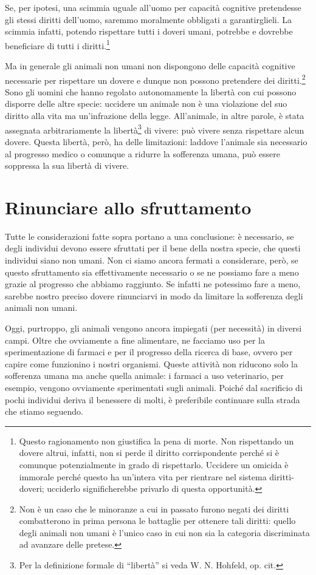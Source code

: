 \documentclass[a4paper,11pt,oneside,article]{memoir}
\begin{document}
Se, per ipotesi, una scimmia uguale all'uomo per capacità cognitive pretendesse
gli stessi diritti dell'uomo, saremmo moralmente obbligati a garantirglieli. La
scimmia infatti, potendo rispettare tutti i doveri umani, potrebbe e dovrebbe
beneficiare di tutti i diritti.\footnote{Questo ragionamento non giustifica la
pena di morte. Non rispettando un dovere altrui, infatti, non si perde il
diritto corrispondente perché si è comunque potenzialmente in grado di
rispettarlo. Uccidere un omicida è immorale perché questo ha un'intera vita per
rientrare nel sistema diritti-doveri; ucciderlo significherebbe privarlo di
questa opportunità.}

Ma in generale gli animali non umani non dispongono delle capacità cognitive
necessarie per rispettare un dovere e dunque non possono pretendere dei
diritti.\footnote{Non è un caso che le minoranze a cui in passato furono negati
dei diritti combatterono in prima persona le battaglie per ottenere tali
diritti: quello degli animali non umani è l'unico caso in cui non sia la
categoria discriminata ad avanzare delle pretese.} Sono gli uomini che hanno
regolato autonomamente la libertà con cui possono disporre delle altre specie:
uccidere un animale non è una violazione del suo diritto alla vita ma
un'infrazione della legge. All'animale, in altre parole, è stata assegnata
arbitrariamente la libertà\footnote{Per la definizione formale di ``libertà'' si
veda W. N. Hohfeld, op. cit.} di vivere: può vivere senza rispettare alcun
dovere. Questa libertà, però, ha delle limitazioni: laddove l'animale sia
necessario al progresso medico o comunque a ridurre la sofferenza umana, può
essere soppressa la sua libertà di vivere.

\chapter{Rinunciare allo sfruttamento}

Tutte le considerazioni fatte sopra portano a una conclusione: è necessario, se
degli individui devono essere sfruttati per il bene della nostra specie, che
questi individui siano non umani. Non ci siamo ancora fermati a considerare,
però, se questo sfruttamento sia effettivamente necessario o se ne possiamo fare
a meno grazie al progresso che abbiamo raggiunto. Se infatti ne potessimo fare a
meno, sarebbe nostro preciso dovere rinunciarvi in modo da limitare la
sofferenza degli animali non umani.

Oggi, purtroppo, gli animali vengono ancora impiegati (per necessità) in diversi
campi. Oltre che ovviamente a fine alimentare, ne facciamo uso per la
sperimentazione di farmaci e per il progresso della ricerca di base, ovvero per
capire come funzionino i nostri organismi. Queste attività non riducono solo la
sofferenza umana ma anche quella animale: i farmaci a uso veterinario, per
esempio, vengono ovviamente sperimentati sugli animali. Poiché dal sacrificio di
pochi individui deriva il benessere di molti, è preferibile continuare sulla
strada che stiamo seguendo.
\end{document}
